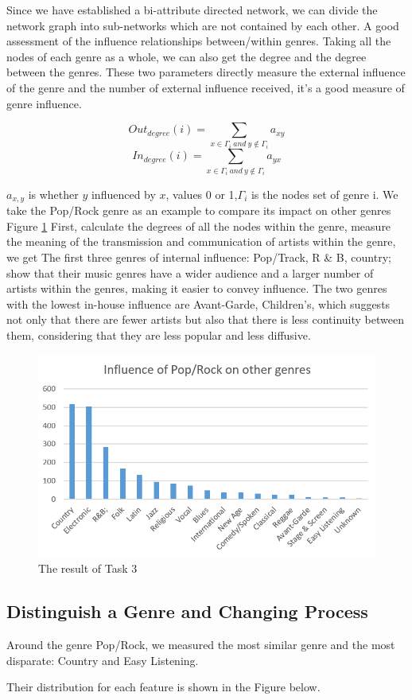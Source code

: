 \documentclass[conference]{IEEEtran}
\begin{document}
Since we have established a bi-attribute directed network, we can divide the network graph into sub-networks which are not contained by each other. A good assessment of the influence relationships between/within genres. Taking all the nodes of each genre as a whole, we can also get the degree and the degree between the genres. These two parameters directly measure the external influence of the genre and the number of external influence received, it’s a good measure of genre influence.

\[Out_{degree}(i)=\sum_{x\in \Gamma_i \ and\  y\notin \Gamma_i}a_{xy}\]
\[In_{degree}(i)=\sum_{x\in \Gamma_i \ and\  y\notin \Gamma_i}a_{yx}\]

$a_{x,y}$ is whether $y$ influenced by $x$, values 0 or 1,$\Gamma_i$ is the nodes set of genre i.
We take the Pop/Rock genre as an example to compare its impact on other genres Figure \ref{fig:result_pop_out}
First, calculate the degrees of all the nodes within the genre, measure the meaning of the transmission and communication of artists within the genre, we get
The first three genres of internal influence: Pop/Track, R \& B, country; show that their music genres have a wider audience and a larger number of artists within the genres, making it easier to convey influence.
The two genres with the lowest in-house influence are Avant-Garde, Children’s, which suggests not only that there are fewer artists but also that there is less continuity between them, considering that they are less popular and less diffusive.

\begin{figure}[htbp]
	\centering
	\includegraphics[width=.3\textwidth]{./img/influence_of_pop_on_others_1}
	\caption{The result of Task 3}\label{fig:result_pop_out}
\end{figure}

\subsection{Distinguish a Genre and Changing Process}
Around the genre Pop/Rock, we measured the most similar genre and the most disparate: Country and Easy Listening.

Their distribution for each feature is shown in the Figure below.
\end{document}
